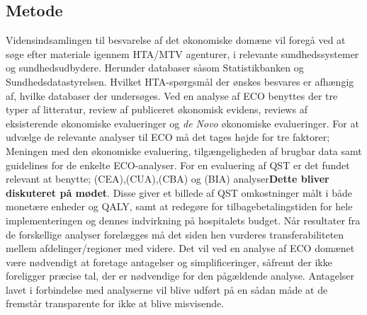 \subsection{Metode \citep{HTAcore}}
Vidensindsamlingen til besvarelse af det økonomiske domæne vil foregå ved at søge efter materiale igennem HTA/MTV agenturer, i relevante sundhedssystemer og sundhedsudbydere. Herunder databaser såsom Statistikbanken og Sundhedsdatastyrelsen. Hvilket HTA-spørgsmål der ønskes besvares er afhængig af, hvilke databaser der undersøges. Ved en analyse af ECO benyttes der tre typer af litteratur, review af publiceret økonomisk evidens, reviews af eksisterende økonomiske evalueringer og \textit{de Novo} økonomiske evalueringer. For at udvælge de relevante analyser til ECO må det tages højde for tre faktorer; Meningen med den økonomiske evaluering, tilgængeligheden af brugbar data samt guidelines for de enkelte ECO-analyser. For en evaluering af QST er det fundet relevant at benytte; (CEA),(CUA),(CBA) og (BIA) analyser\textbf{Dette bliver diskuteret på mødet}. Disse giver et billede af QST omkostninger målt i både monetære enheder og QALY, samt at redegøre for tilbagebetalingstiden for hele implementeringen og dennes indvirkning på hospitalets budget. Når resultater fra de forskellige analyser forelægges må det siden hen vurderes transferabiliteten mellem afdelinger/regioner med videre. Det vil ved en analyse af ECO domænet være nødvendigt at foretage antagelser og simplificeringer, såfremt der ikke foreligger præcise tal, der er nødvendige for den pågældende analyse. Antagelser lavet i forbindelse med analyserne vil blive udført på en sådan måde at de fremstår transparente for ikke at blive misvisende. 


